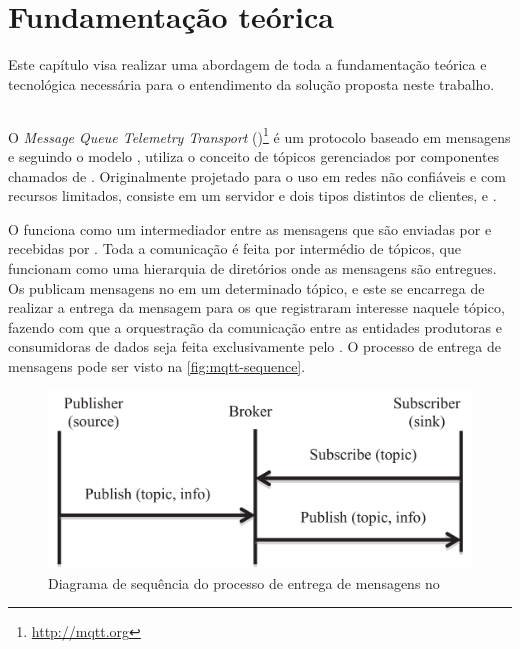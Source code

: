 \chapter{Fundamentação teórica} \label{chap:fundamentacao}

Este capítulo visa realizar uma abordagem de toda a fundamentação teórica e tecnológica necessária para o entendimento da solução proposta neste trabalho.

\section{\mqtt}

O \textit{Message Queue Telemetry Transport} (\mqtt)\footnote{\url{http://mqtt.org}} é um protocolo baseado em mensagens e seguindo o modelo \pubsub, utiliza o conceito de tópicos gerenciados por componentes chamados de \brokers. Originalmente projetado para o uso em redes não confiáveis e com recursos limitados, consiste em um servidor \broker e dois tipos distintos de clientes, \pubs e \subs \cite{lee:et-al:2013}.

O \broker funciona como um intermediador entre as mensagens que são enviadas por \pubs e recebidas por \subs. Toda a comunicação é feita por intermédio de tópicos, que funcionam como uma hierarquia de diretórios onde as mensagens são entregues. Os \pubs publicam mensagens no \broker em um determinado tópico, e este se encarrega de realizar a entrega da mensagem para os \subs que registraram interesse naquele tópico, fazendo com que a orquestração da comunicação entre as entidades produtoras e consumidoras de dados seja feita exclusivamente pelo \broker. O processo de entrega de mensagens pode ser visto na \autoref{fig:mqtt-sequence}.

\begin{figure}[htb]
	\caption{Diagrama de sequência do processo de entrega de mensagens no \mqtt}
	\label{fig:mqtt-sequence}
	\centering
	\includegraphics[width=0.85\linewidth]{img/mqtt-sequence.png}
\end{figure}


